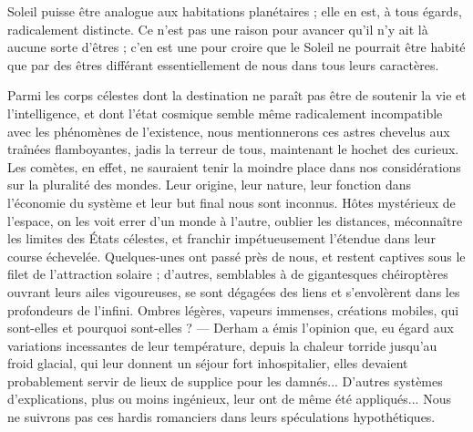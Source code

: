 \documentclass[a4paper, 11pt, oneside]{article}
\begin{document}
Soleil puisse être analogue aux habitations planétaires ; elle en est, à tous égards, radicalement distincte. Ce n'est pas une raison pour avancer qu'il n'y ait là aucune sorte d'êtres ; c'en est une pour croire que le Soleil ne pourrait être habité que par des êtres différant essentiellement de nous dans tous leurs caractères.

Parmi les corps célestes dont la destination ne paraît pas être de soutenir la vie et l'intelligence, et dont l'état cosmique semble même radicalement incompatible avec les phénomènes de l'existence, nous mentionnerons ces astres chevelus aux traînées flamboyantes, jadis la terreur de tous, maintenant le hochet des curieux. Les comètes, en effet, ne sauraient tenir la moindre place dans nos considérations sur la pluralité des mondes. Leur origine, leur nature, leur fonction dans l'économie du système et leur but final nous sont inconnus. Hôtes mystérieux de l'espace, on les voit errer d'un monde à l'autre, oublier les distances, méconnaître les limites des États célestes, et franchir impétueusement l'étendue dans leur course échevelée. Quelques-unes ont passé près de nous, et restent captives sous le filet de l'attraction solaire ; d'autres, semblables à de gigantesques chéiroptères ouvrant leurs ailes vigoureuses, se sont dégagées des liens et s'envolèrent dans les profondeurs de l'infini. Ombres légères, vapeurs immenses, créations mobiles, qui sont-elles et pourquoi sont-elles ? --- Derham a émis l'opinion que, eu égard aux variations incessantes de leur température, depuis la chaleur torride jusqu'au froid glacial, qui leur donnent un séjour fort inhospitalier, elles devaient probablement servir de lieux de supplice pour les damnés... D'autres systèmes d'explications, plus ou moins ingénieux, leur ont de même été appliqués... Nous ne suivrons pas ces hardis romanciers dans leurs spéculations hypothétiques.
\end{document}
